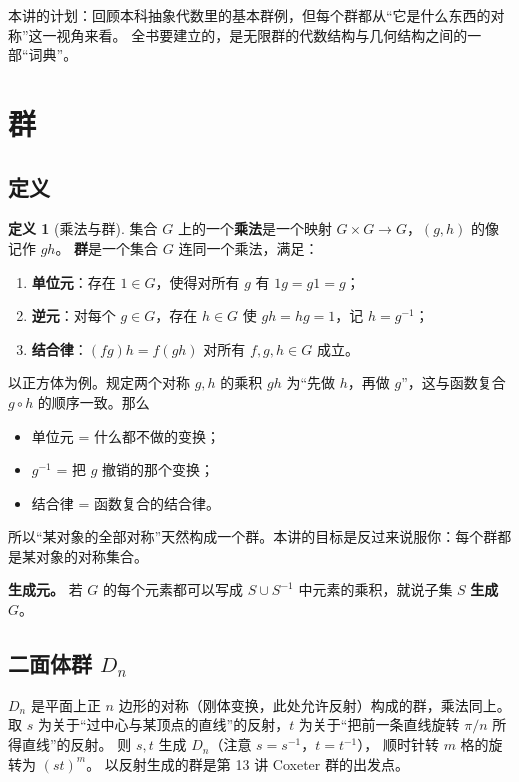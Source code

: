 \documentclass[11pt,a4paper]{article}
\theoremstyle{definition}
\newtheorem{definition}{定义}[section]
\theoremstyle{plain}
\theoremstyle{remark}
\begin{document}
本讲的计划：回顾本科抽象代数里的基本群例，但每个群都从“它是什么东西的对称”这一视角来看。
全书要建立的，是无限群的代数结构与几何结构之间的一部“词典”。

\section{群}

\subsection{定义}

\begin{definition}[乘法与群]
集合 $G$ 上的一个\textbf{乘法}是一个映射 $G\times G\to G$，$(g,h)$ 的像记作 $gh$。
\textbf{群}是一个集合 $G$ 连同一个乘法，满足：
\begin{enumerate}[nosep,label=(\roman*)]
  \item \textbf{单位元}：存在 $1\in G$，使得对所有 $g$ 有 $1g=g1=g$；
  \item \textbf{逆元}：对每个 $g\in G$，存在 $h\in G$ 使 $gh=hg=1$，记 $h=g^{-1}$；
  \item \textbf{结合律}：$(fg)h=f(gh)$ 对所有 $f,g,h\in G$ 成立。
\end{enumerate}
\end{definition}

\begin{keyidea}[为什么这个定义讲的就是“对称”]
以正方体为例。规定两个对称 $g,h$ 的乘积 $gh$ 为“先做 $h$，再做 $g$”，这与函数复合 $g\circ h$ 的顺序一致。那么
\begin{itemize}[nosep]
  \item 单位元 = 什么都不做的变换；
  \item $g^{-1}$ = 把 $g$ 撤销的那个变换；
  \item 结合律 = 函数复合的结合律。
\end{itemize}
所以“某对象的全部对称”天然构成一个群。本讲的目标是反过来说服你：每个群都是某对象的对称集合。
\end{keyidea}

\textbf{生成元。} 若 $G$ 的每个元素都可以写成 $S\cup S^{-1}$ 中元素的乘积，就说子集 $S$ \textbf{生成} $G$。

\subsection{二面体群 $D_n$}

$D_n$ 是平面上正 $n$ 边形的对称（刚体变换，此处允许反射）构成的群，乘法同上。
取 $s$ 为关于“过中心与某顶点的直线”的反射，$t$ 为关于“把前一条直线旋转 $\pi/n$ 所得直线”的反射。
则 $s,t$ 生成 $D_n$（注意 $s=s^{-1}$，$t=t^{-1}$），
顺时针转 $m$ 格的旋转为 $(st)^m$。
以反射生成的群是第 13 讲 Coxeter 群的出发点。
\end{document}
